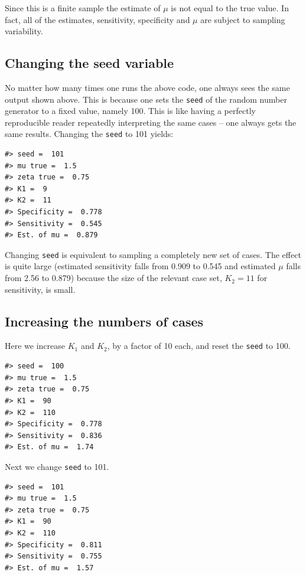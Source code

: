 \documentclass[
]{book}
\begin{document}
Since this is a finite sample the estimate of \(\mu\) is not equal to the true value. In fact, all of the estimates, sensitivity, specificity and \(\mu\) are subject to sampling variability.

\hypertarget{changing-the-seed-variable}{%
\subsection{Changing the seed variable}\label{changing-the-seed-variable}}

No matter how many times one runs the above code, one always sees the same output shown above. This is because one sets the \texttt{seed} of the random number generator to a fixed value, namely 100. This is like having a perfectly reproducible reader repeatedly interpreting the same cases -- one always gets the same results. Changing the \texttt{seed} to 101 yields:

\begin{verbatim}
#> seed =  101 
#> mu true =  1.5 
#> zeta true =  0.75 
#> K1 =  9 
#> K2 =  11 
#> Specificity =  0.778 
#> Sensitivity =  0.545 
#> Est. of mu =  0.879
\end{verbatim}

Changing \texttt{seed} is equivalent to sampling a completely new set of cases. The effect is quite large (estimated sensitivity falls from 0.909 to 0.545 and estimated \(\mu\) falls from 2.56 to 0.879) because the size of the relevant case set, \(K_2=11\) for sensitivity, is small.

\hypertarget{increasing-the-numbers-of-cases}{%
\subsection{Increasing the numbers of cases}\label{increasing-the-numbers-of-cases}}

Here we increase \(K_1\) and \(K_2\), by a factor of 10 each, and reset the \texttt{seed} to 100.

\begin{verbatim}
#> seed =  100 
#> mu true =  1.5 
#> zeta true =  0.75 
#> K1 =  90 
#> K2 =  110 
#> Specificity =  0.778 
#> Sensitivity =  0.836 
#> Est. of mu =  1.74
\end{verbatim}

Next we change \texttt{seed} to 101.

\begin{verbatim}
#> seed =  101 
#> mu true =  1.5 
#> zeta true =  0.75 
#> K1 =  90 
#> K2 =  110 
#> Specificity =  0.811 
#> Sensitivity =  0.755 
#> Est. of mu =  1.57
\end{verbatim}
\end{document}
